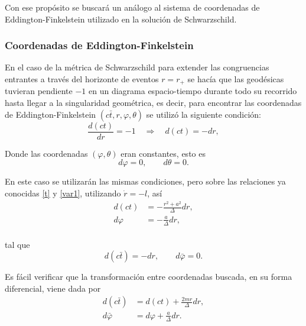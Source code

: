 Con ese prop\'osito se buscar\'a un an\'alogo al sistema de coordenadas de Eddington-Finkelstein utilizado en la soluci\'on de Schwarzschild. 

\subsubsection{Coordenadas de Eddington-Finkelstein} 

En el caso de la m\'etrica de Schwarzschild para extender las congruencias entrantes a trav\'es del horizonte de eventos $r=r_+$ se hac\'ia que las geod\'esicas tuvieran pendiente $-1$ en un diagrama espacio-tiempo durante todo su recorrido hasta llegar a la singularidad geom\'etrica, es decir, para encontrar las coordenadas de Eddington-Finkelstein $(c\bar{t},r,\varphi,\theta)$ se utiliz\'o la siguiente condici\'on: 
\begin{equation}
\frac{d(ct)}{dr}=-1 \quad \Rightarrow \quad d(ct)=-dr,
\end{equation}

Donde las coordenadas $(\varphi,\theta )$ eran constantes, esto es
\begin{equation}
d\varphi=0, \qquad d\theta=0 .
\end{equation}

En este caso se utilizar\'an las mismas condiciones, pero sobre las relaciones ya conocidas \eqref{t} y \eqref{var1}, utilizando $\dot{r}=-l$, as\'i
\begin{equation}
\begin{aligned}
d(ct)&=-\frac{r^2+a^2}{\Delta}dr,\\
d \varphi&=-\frac{a}{\Delta}dr,\\
\end{aligned}
\end{equation}

tal que
\begin{equation}
d\left(c\bar{t}\right)=-dr, \qquad d\bar{\varphi}=0 .
\end{equation}

Es f\'acil verificar que la transformaci\'on entre coordenadas buscada, en su forma diferencial, viene dada por
\begin{equation}
\begin{aligned}
d\left(c\bar{t}\right)&=d(ct)+\frac{2mr}{\Delta}dr,\\
d\bar{\varphi}&=d	\varphi+\frac{a}{\Delta}dr.\\
\end{aligned}
\end{equation}

